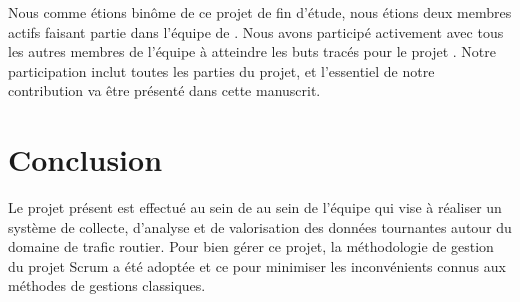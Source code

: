 Nous comme étions binôme de ce projet de fin d'étude, nous étions deux membres actifs faisant
partie dans l'équipe de . Nous avons participé activement
avec tous les autres membres de l'équipe à atteindre les buts tracés pour le
projet . Notre participation inclut toutes les parties du
projet, et l'essentiel de notre contribution va être présenté dans cette
manuscrit.




\section*{Conclusion}

Le projet présent est effectué au sein de  au sein
de l'équipe  qui vise à réaliser un système de collecte,
d'analyse et de valorisation des données tournantes autour du domaine de trafic
routier. Pour bien gérer ce projet, la méthodologie de gestion du projet Scrum
a été adoptée et ce pour minimiser les inconvénients connus aux méthodes de
gestions classiques.
